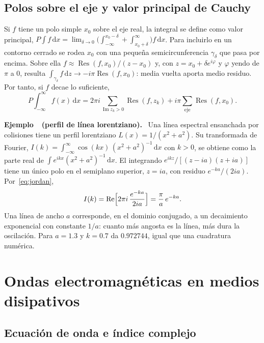 \documentclass[11pt,letterpaper]{article}
\newcounter{ejemplo}
\newenvironment{ejemplo}[1]{%
  \refstepcounter{ejemplo}%
  \begin{ejemplobox}\textbf{Ejemplo~\theejemplo\ (#1).}\ }%
  {\end{ejemplobox}}
\newcommand{\dd}{\mathrm{d}}
\DeclareMathOperator{\Res}{Res}
\renewcommand{\Re}{\operatorname{Re}}
\renewcommand{\Im}{\operatorname{Im}}
\newcommand{\vp}{P}   %
\begin{document}
\subsection{Polos sobre el eje y valor principal de Cauchy}\label{sec:vp}

Si $f$ tiene un polo simple $x_0$ sobre el eje real, la integral se define como
valor principal,
$\vp\!\int f\,\dd x=\lim_{\delta\to0}\bigl(\int_{-\infty}^{x_0-\delta}
+\int_{x_0+\delta}^{\infty}\bigr)f\,\dd x$. Para incluirlo en un contorno
cerrado se rodea $x_0$ con una pequeña semicircunferencia $\gamma_\delta$ que
pasa por encima. Sobre ella $f\approx\Res(f,x_0)/(z-x_0)$ y, con
$z=x_0+\delta e^{i\varphi}$ y $\varphi$ yendo de $\pi$ a $0$, resulta
$\int_{\gamma_\delta}f\,\dd z\to-i\pi\Res(f,x_0)$: media vuelta aporta medio
residuo. Por tanto, si $f$ decae lo suficiente,
\begin{equation}\label{eq:vp}
  \vp\!\int_{-\infty}^{\infty}f(x)\,\dd x
  =2\pi i\sum_{\Im z_k>0}\Res(f,z_k)+i\pi\sum_{\text{eje}}\Res(f,x_0).
\end{equation}

\begin{ejemplo}{perfil de línea lorentziano}\label{ej:lorentz}
Una línea espectral ensanchada por colisiones tiene un perfil lorentziano
$L(x)=1/(x^2+a^2)$. Su transformada de Fourier,
$I(k)=\int_{-\infty}^{\infty}\cos(kx)\,(x^2+a^2)^{-1}\,\dd x$ con $k>0$, se
obtiene como la parte real de $\int e^{ikx}(x^2+a^2)^{-1}\,\dd x$. El
integrando $e^{ikz}/[(z-ia)(z+ia)]$ tiene un único polo en el semiplano
superior, $z=ia$, con residuo $e^{-ka}/(2ia)$. Por~\eqref{eq:jordan},
\[
  I(k)=\Re\Bigl[2\pi i\,\frac{e^{-ka}}{2ia}\Bigr]=\frac{\pi}{a}\,e^{-ka}.
\]
Una línea de ancho $a$ corresponde, en el dominio conjugado, a un decaimiento
exponencial con constante $1/a$: cuanto más angosta es la línea, más dura la
oscilación. Para $a=1.3$ y $k=0.7$ da $0.972744$, igual que una cuadratura
numérica.
\end{ejemplo}

\section{Ondas electromagnéticas en medios disipativos}\label{sec:medios}

\subsection{Ecuación de onda e índice complejo}
\end{document}
